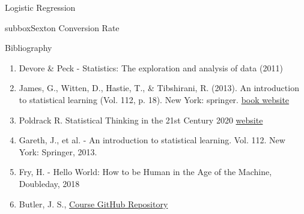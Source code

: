 \documentclass[10pt,a4paper]{article}
\begin{document}
\begin{multicols}{3}
\begin{textbox}{Logistic Regression}
\begin{subbox}{subbox}{Sexton Conversion Rate}
\end{subbox}
\end{textbox}
\begin{textbox}{Bibliography}
\begin{enumerate}
\item 
Devore \& Peck  - Statistics: The exploration and analysis of data (2011)
\item James, G., Witten, D., Hastie, T., \& Tibshirani, R. (2013). An introduction to statistical learning (Vol. 112, p. 18). New York: springer. 
\href{https://www.statlearning.com}{book website}
\item Poldrack R. Statistical Thinking in the 21st Century 2020 \href{https://statsthinking21.github.io/statsthinking21-core-site/index.html}{website}
\item
Gareth, J., et al. - An introduction to statistical learning. Vol. 112. New York: Springer, 2013.
\item
Fry, H. - Hello World: How to be Human in the Age of the Machine, Doubleday, 2018
\item Butler, J. S., \href{https://github.com/john-s-butler-dit/Probability_and_Statistical_Inference}{Course GitHub Repository}  

\end{enumerate}


\end{textbox}

\end{multicols}
\end{document}
